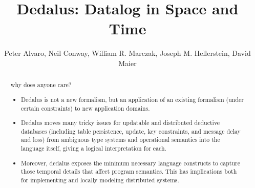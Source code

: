 \documentclass{acm_proc_article-sp-sigmod09}
\begin{document}
%

\title{Dedalus: 
Datalog in Space and Time} 
%


\author{Peter Alvaro, Neil Conway, William R. Marczak, Joseph M. Hellerstein, David Maier}

\maketitle

\begin{abstract}

why does anyone care?

\begin{itemize}
\item Dedalus is not a new formalism, but an application of an existing formalism (under certain constraints) to new application domains.
\item Dedalus moves many tricky issues for updatable and distributed deductive databases (including table persistence, update, key constraints, and message delay and loss) from ambiguous type systems and operational semantics into the language itself, giving a logical interpretation for each.
\item Moreover, dedalus exposes the minimum necessary language constructs to capture those temporal details that affect program semantics.  This has
implications both for implementing and locally modeling distributed systems.
\end{itemize}
\end{abstract}













\appendix


\end{document}
